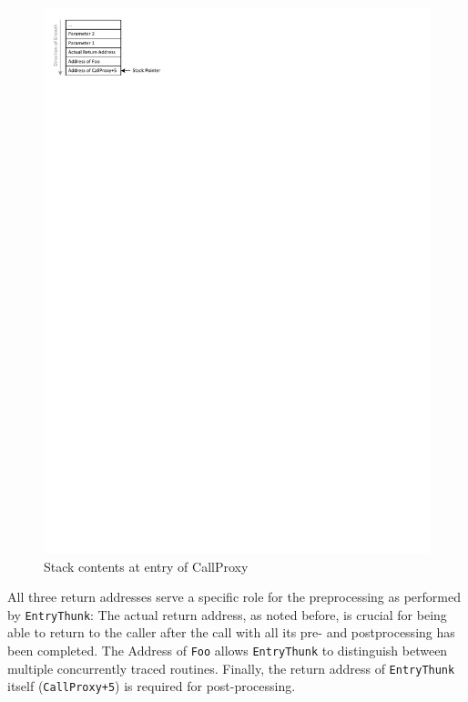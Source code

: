 \begin{figure}[htbp] 
\begin{centering} 
\includegraphics[scale=1, clip=true, viewport=0cm 26cm 7cm 30cm]{images/diagrams/EntryExitTracing_StackAt4.pdf} 
\caption{Stack contents at entry of CallProxy} 
\label{EntryExitTracing_StackAt4} 
\end{centering} 
\end{figure}

All three return addresses serve a specific role for the preprocessing as performed
by \verb|EntryThunk|: The actual return address, as noted before, is crucial for being
able to return to the caller after the call with all its pre- and postprocessing has 
been completed. The Address of \verb|Foo| allows \verb|EntryThunk| to distinguish
between multiple concurrently traced routines. Finally, the return address of 
\verb|EntryThunk| itself (\verb|CallProxy+5|) is required for post-processing.

